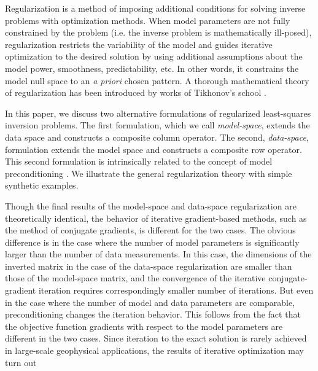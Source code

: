 Regularization is a method of imposing additional conditions for
solving inverse problems with optimization methods. When model
parameters are not fully constrained by the problem (i.e. the inverse
problem is mathematically ill-posed), regularization restricts the
variability of the model and guides iterative optimization to the
desired solution by using additional assumptions about the model power,
smoothness, predictability, etc. In other words, it constrains the
model null space to an \emph{a priori} chosen pattern.  A thorough
mathematical theory of regularization has been introduced by works of
Tikhonov's school \cite[]{tikh}.
\par
In this paper, we discuss two alternative formulations of regularized
least-squares inversion problems. The first formulation, which we call
\emph{model-space}, extends the data space and constructs a composite
column operator. The second, \emph{data-space}, formulation extends
the model space and constructs a composite row operator. This second
formulation is intrinsically related to the concept of model
preconditioning \cite[]{GEO59-05-08180829}. We illustrate the general
regularization theory with simple synthetic examples.
\par
Though the final results of the model-space and data-space
regularization are theoretically identical, the behavior of iterative
gradient-based methods, such as the method of conjugate gradients, is
different for the two cases. The obvious difference is in the case
where the number of model parameters is significantly larger than the
number of data measurements. In this case, the dimensions of the
inverted matrix in the case of the data-space regularization are
smaller than those of the model-space matrix, and the convergence of
the iterative conjugate-gradient iteration requires correspondingly
smaller number of iterations.  But even in the case where the number
of model and data parameters are comparable, preconditioning changes
the iteration behavior. This follows from the fact that the objective
function gradients with respect to the model parameters are different
in the two cases.
Since iteration to the exact solution is rarely achieved in large-scale
geophysical applications, the results of iterative optimization may turn out
